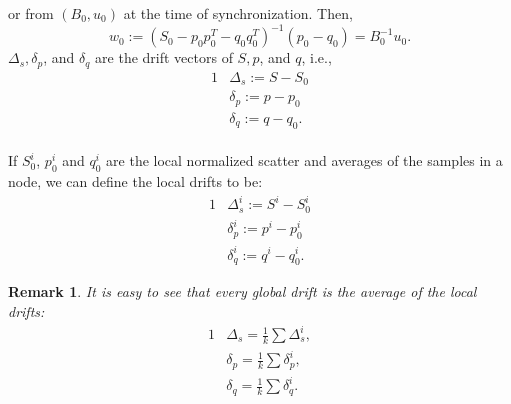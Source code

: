 \documentclass{sig-alternate-05-2015}
\newtheorem{remark}{Remark}
\begin{document}
or from $(B_0,u_0)$ at the time of synchronization.
Then,
\begin{equation*}
w_0:=(S_0 - p_0p_0^T - q_0q_0^T)^{-1}(p_0-q_0)=B_0^{-1}u_0.
\end{equation*}
$\Delta_s, \delta_p$, and $\delta_q$ are the drift vectors of $S, p$, and $q$,
i.e.,
\begin{alignat*}{1}
& \Delta_s:= S - S_0 \\
& \delta_p:= p - p_0 \\
& \delta_q := q - q_0.
\end{alignat*}
\\If $S_0^i$, $p_0^i$ and $q_0^i$ are the local normalized scatter and averages
of the samples in a node, we can define the local drifts to be:
\begin{alignat*}{1}
& \Delta_s^i:= S^i - S_0^i
\\ & \delta_p^i:= p^i - p_0^i
\\ & \delta_q^i:= q^i - q_0^i.
\end{alignat*}
\begin{remark} \label{average}
It is easy to see that every global drift is the average of the local drifts:
\begin{alignat*}{1}
& \Delta_s = \frac{1}{k} \sum \Delta_s^i, \\
& \delta_p = \frac{1}{k} \sum \delta_p^i, \\
& \delta_q = \frac{1}{k} \sum \delta_q^i.
\end{alignat*}

\end{remark}
\end{document}
